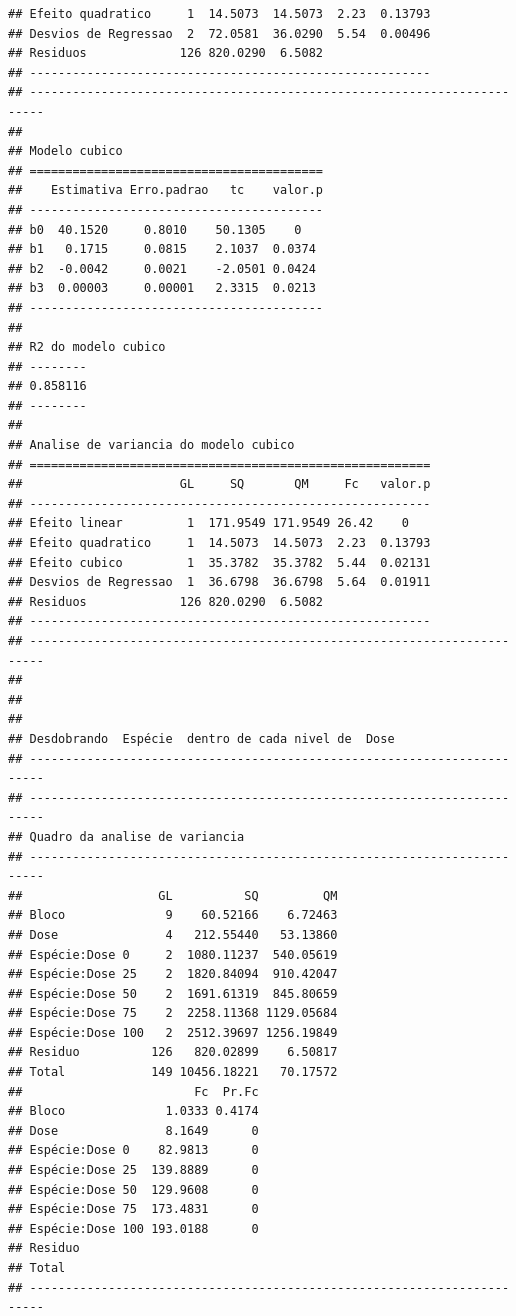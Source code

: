 \documentclass[
]{article}
\begin{document}
\begin{verbatim}
## Efeito quadratico     1  14.5073  14.5073  2.23  0.13793
## Desvios de Regressao  2  72.0581  36.0290  5.54  0.00496
## Residuos             126 820.0290  6.5082               
## --------------------------------------------------------
## ------------------------------------------------------------------------
## 
## Modelo cubico
## =========================================
##    Estimativa Erro.padrao   tc    valor.p
## -----------------------------------------
## b0  40.1520     0.8010    50.1305    0   
## b1   0.1715     0.0815    2.1037  0.0374 
## b2  -0.0042     0.0021    -2.0501 0.0424 
## b3  0.00003     0.00001   2.3315  0.0213 
## -----------------------------------------
## 
## R2 do modelo cubico
## --------
## 0.858116
## --------
## 
## Analise de variancia do modelo cubico
## ========================================================
##                      GL     SQ       QM     Fc   valor.p
## --------------------------------------------------------
## Efeito linear         1  171.9549 171.9549 26.42    0   
## Efeito quadratico     1  14.5073  14.5073  2.23  0.13793
## Efeito cubico         1  35.3782  35.3782  5.44  0.02131
## Desvios de Regressao  1  36.6798  36.6798  5.64  0.01911
## Residuos             126 820.0290  6.5082               
## --------------------------------------------------------
## ------------------------------------------------------------------------
## 
## 
## 
## Desdobrando  Espécie  dentro de cada nivel de  Dose 
## ------------------------------------------------------------------------
## ------------------------------------------------------------------------
## Quadro da analise de variancia
## ------------------------------------------------------------------------
##                   GL          SQ         QM
## Bloco              9    60.52166    6.72463
## Dose               4   212.55440   53.13860
## Espécie:Dose 0     2  1080.11237  540.05619
## Espécie:Dose 25    2  1820.84094  910.42047
## Espécie:Dose 50    2  1691.61319  845.80659
## Espécie:Dose 75    2  2258.11368 1129.05684
## Espécie:Dose 100   2  2512.39697 1256.19849
## Residuo          126   820.02899    6.50817
## Total            149 10456.18221   70.17572
##                        Fc  Pr.Fc
## Bloco              1.0333 0.4174
## Dose               8.1649      0
## Espécie:Dose 0    82.9813      0
## Espécie:Dose 25  139.8889      0
## Espécie:Dose 50  129.9608      0
## Espécie:Dose 75  173.4831      0
## Espécie:Dose 100 193.0188      0
## Residuo                         
## Total                           
## ------------------------------------------------------------------------

\end{verbatim}
\end{document}
